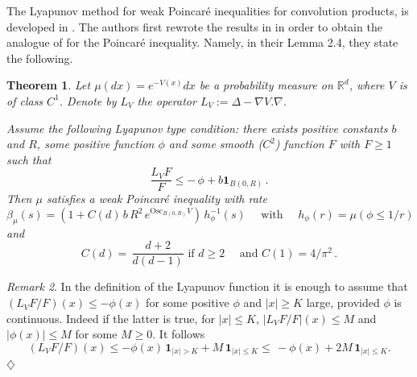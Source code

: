 \documentclass[11pt,reqno]{amsart}
\numberwithin{equation}{section}
\newtheorem{theorem}{Theorem}[section]
\theoremstyle{definition}
\theoremstyle{remark}
\newtheorem{remark}[theorem]{Remark}
\def \Osc {\textrm{Osc}}
\begin{document}
The Lyapunov method for weak Poincar\'e inequalities for convolution products, is developed in \cite{weakconvol}. The authors first rewrote the results in \cite{CGGR} in order to obtain the analogue of \cite{BBCG} for the Poincar\'e inequality. Namely, in their Lemma 2.4, they state the following.
\begin{theorem}\label{lyapweakP}
Let $\mu(dx)=e^{-V(x)} dx$ be a probability measure on $\mathbb R^d$, where $V$ is of class $C^1$. Denote by $L_V$ the operator $L_V:=\Delta - \nabla V. \nabla$.

Assume the following Lyapunov type condition: there exists positive constants $b$ and $R$, some positive function $\phi$ and some smooth ($C^2$) function $F$ with $F\geq 1$ such that 
\begin{equation}\label{eqweaklyap}
\frac{L_VF}{F} \leq - \, \phi + b \mathbf 1_{B(0,R)} \, .
\end{equation}
 Then $\mu$ satisfies a weak Poincar\'e inequality with rate $$\beta_\mu(s)= \left(1 + C(d) \, b \, R^2 \, e^{\Osc_{B(0,R)} V}\right) \, h_\phi^{-1}(s) \quad \textrm{ with } \quad h_\phi(r) = \mu(\phi\leq 1/r)$$  and $$C(d)= \, \frac{d+2}{d(d-1)} \textrm{ if $d\geq 2$} \quad \textrm{ and } C(1)= 4/\pi^2 \, .$$
\end{theorem}
\begin{remark}\label{remlyapR}
In the definition of the Lyapunov function it is enough to assume that $(L_VF/F)(x) \leq - \phi(x)$ for some positive $\phi$ and $|x|\geq K$ large, provided $\phi$ is continuous. Indeed if the latter is true, for $|x|\leq K$, $|L_VF/F|(x)\leq M$ and $|\phi(x)| \leq  M$ for some $M\geq 0$. It follows $$(L_VF/F)(x) \leq - \phi (x)\,\mathbf 1_{|x|>K} + M \,\mathbf 1_{|x|\leq K} \leq \, - \phi (x) + 2M\, \mathbf 1_{|x|\leq K}.$$
\hfill $\diamondsuit$
\end{remark}
\end{document}

